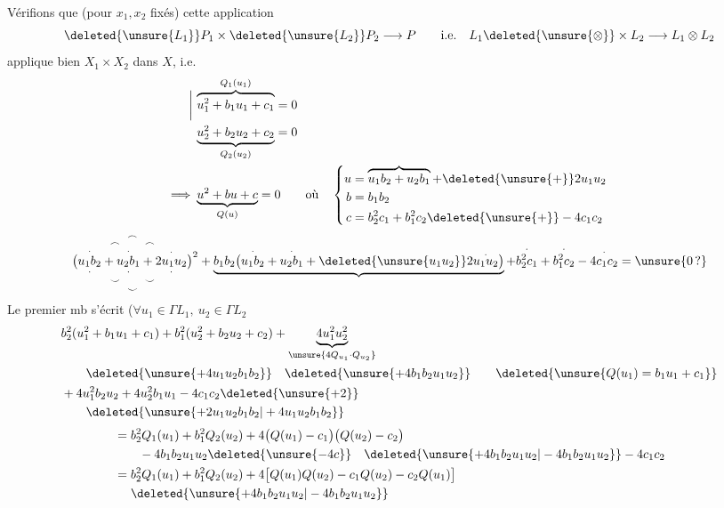 
Vérifions que (pour $x_1,x_2$ fixés)  cette application
\[
\deleted{\unsure{L_1}}P_1\times\deleted{\unsure{L_2}}P_2\longrightarrow P\qquad\text{i.e.}\quad L_1\deleted{\unsure{\otimes}}\times L_2\longrightarrow L_1\otimes L_2
\]
 applique bien $X_1\times X_2$ dans $X$, i.e.
\[
\begin{aligned}\bigg|\, &\overbrace{u_1^2+b_1u_1+c_1}^{Q_1(u_1)}=0\\ &\underbrace{u_2^2+b_2u_2+c_2}_{Q_2(u_2)}=0\\ \Longrightarrow\ &\underbrace{u^2+bu+c}_{Q(u)}=0\qquad\text{où}\quad\left\{\begin{aligned}u&=\overbrace{u_1b_2+u_2b_1}+\deleted{\unsure{+}}2u_1u_2\\ b&=b_1b_2\\ c&=b_2^2c_1+b_1^2c_2\deleted{\unsure{+}}-4c_1c_2\end{aligned}\right.\end{aligned}
\]
\[
\big(\overset{\frown}{\underset{\smile}{\overset{\frown\qquad\frown}{\underset{\smile\qquad\smile}{\underset{\cdot}{\overset{\cdot}{u_1b_2}}+\underset{\cdot}{\overset{\cdot}{u_2b_1}}+\underset{\cdot}{\overset{\cdot}{2u_1u_2}}}}}}\big)^2+\underbrace{b_1b_2\big(\overset{\cdot}{u_1b_2}+\overset{\cdot}{u_2b_1}+\deleted{\unsure{u_1u_2}}2\overset{\cdot}{u_1u_2}\big)}+\overset{\cdot}{b_2^2c_1}+\overset{\cdot}{b_1^2c_2}-\overset{\cdot}{4c_1c_2}=\unsure{0\,?}
\]
 Le premier mb s'écrit ($\forall u_1\in\Gamma L_1,\ u_2\in\Gamma L_2$
\[
\begin{aligned}&b_2^2(u_1^2+b_1u_1+c_1)+b_1^2(u_2^2+b_2u_2+c_2)+\underbrace{4u_1^2u_2^2}_{\unsure{4Q_{u_1}\cdot Q_{u_2}}}\\ &\qquad\deleted{\unsure{+4u_1u_2b_1b_2}}\quad\deleted{\unsure{+4b_1b_2u_1u_2}}\qquad\deleted{\unsure{Q(u_1)=b_1u_1+c_1}}\\ &+4u_1^2b_2u_2+4u_2^2b_1u_1-4c_1c_2\deleted{\unsure{+2}}\\ &\qquad\deleted{\unsure{+2u_1u_2b_1b_2|+4u_1u_2b_1b_2}}\end{aligned}
\]
\[
\begin{aligned}&=b_2^2Q_1(u_1)+b_1^2Q_2(u_2)+4\big(Q(u_1)-c_1\big)\big(Q(u_2)-c_2\big)\\ &\qquad -4b_1b_2u_1u_2\deleted{\unsure{-4c}}\quad\deleted{\unsure{+4b_1b_2u_1u_2|-4b_1b_2u_1u_2}}-4c_1c_2\\ &=b_2^2Q_1(u_1)+b_1^2Q_2(u_2)+4\big[Q(u_1)Q(u_2)-c_1Q(u_2)-c_2Q(u_1)\big]\\ &\phantom{{}={}}\deleted{\unsure{+4b_1b_2u_1u_2|-4b_1b_2u_1u_2}}\end{aligned}
\]

